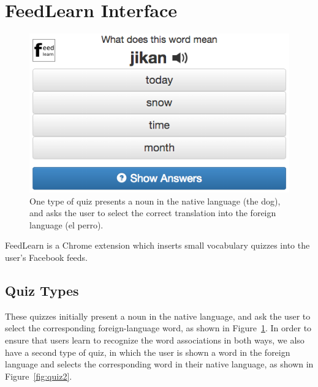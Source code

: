 \documentclass{sigchi}
\begin{document}
\section{FeedLearn Interface}

\begin{figure}
\centering
\includegraphics[width=2.0\columnwidth]{quiz1}
\caption{One type of quiz presents a noun in the native language (the dog), and asks the user to select the correct translation into the foreign language (el perro).}
\label{fig:quiz1}
\end{figure}

FeedLearn is a Chrome extension which inserts small vocabulary quizzes into the user's Facebook feeds.

\subsection{Quiz Types}

These quizzes initially present a noun in the native language, and ask the user to select the corresponding foreign-language word, as shown in Figure~\ref{fig:quiz1}. In order to ensure that users learn to recognize the word associations in both ways, we also have a second type of quiz, in which the user is shown a word in the foreign language and selects the corresponding word in their native language, as shown in Figure~\ref{fig:quiz2}.
\end{document}
